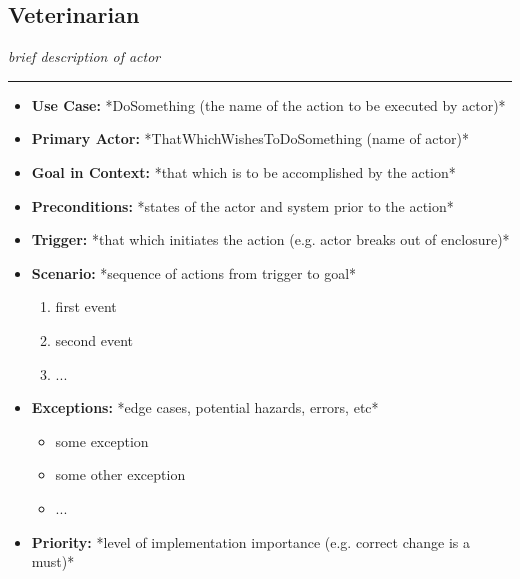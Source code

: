 \documentclass[12pt]{article}
\begin{document}
    \subsection{Veterinarian}
    \textit{brief description of actor}
    \par\noindent\rule{\textwidth}{0.4pt}    
    \begin{itemize}
        \item[]\textbf{Use Case:}                                
            *DoSomething (the name of the action to be executed by actor)*

        \item[]\textbf{Primary Actor:}
            *ThatWhichWishesToDoSomething (name of actor)*

        \item[]\textbf{Goal in Context:}
            *that which is to be accomplished by the action*

        \item[]\textbf{Preconditions:}
            *states of the actor and system prior to the action*

        \item[]\textbf{Trigger:}
            *that which initiates the action (e.g. actor breaks out of enclosure)*

        \item[]\textbf{Scenario:}
            *sequence of actions from trigger to goal*
            \begin{enumerate}
                \item first event
                \item second event
                \item ...
            \end{enumerate}

        \item[]\textbf{Exceptions:}
            *edge cases, potential hazards, errors, etc*
            \begin{itemize}
                \item[] some exception
                \item[] some other exception                
                \item[] ...
            \end{itemize}

        \item[]\textbf{Priority:}
            *level of implementation importance (e.g. correct change is a must)*


\end{itemize}
\end{document}
